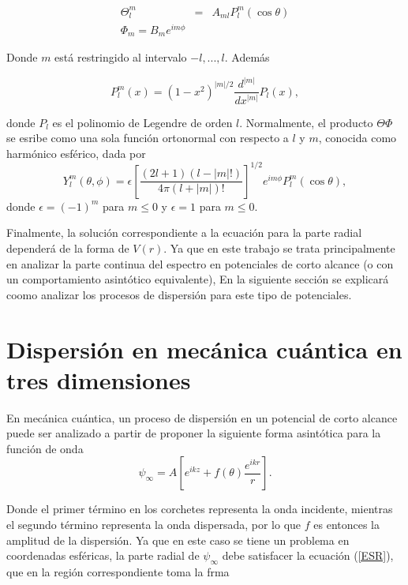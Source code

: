 \begin{eqnarray*}
	\Theta^m_l & = & A_{ml} P^m_l(\cos{\theta})
	\\
	\Phi_m =B_m  e^{i m \phi}
\end{eqnarray*}

Donde $m$ está restringido al intervalo $-l, ... ,l$. Además

\begin{equation*}
	P^m_l(x) = (1-x^2)^{|m|/2} \frac{d^{|m|}}{dx^{|m|}} P_l(x),
\end{equation*}

donde $P_l$ es el polinomio de Legendre de orden $l$. Normalmente, el producto $\Theta \Phi$ se esribe como una sola función ortonormal con respecto a $l$ y $m$, conocida como harmónico esférico, dada por
\begin{equation*}
Y^m_l(\theta,\phi) = \epsilon \left[ \frac{(2l + 1)(l - |m|!)}{4 \pi (l + |m|)!}\right]^{1/2} e^{i m \phi}P^m_l(\cos{\theta}),
\end{equation*}
donde $\epsilon=(-1)^m$ para $m \le 0$ y $\epsilon=1$ para $m \le 0$.

Finalmente, la solución correspondiente a la ecuación para la parte radial dependerá de la forma de $V(r)$.
Ya que en este trabajo se trata principalmente en analizar la parte continua del espectro en potenciales de corto alcance (o con un comportamiento asintótico equivalente), En la siguiente sección se explicará coomo analizar los procesos de dispersión para este tipo de potenciales.



\section{Dispersión en mecánica cuántica en tres dimensiones}

En mecánica cuántica, un proceso de dispersión en un potencial de corto alcance puede ser analizado a partir de proponer la siguiente forma asintótica para la función de onda
\begin{equation}
	\psi_{\infty} = A \left[e^{i k z} + f(\theta)  \frac{e^{i k r}}{r} \right]. \label{FAD}
\end{equation}

Donde el primer término en los corchetes representa la onda incidente, mientras el segundo término representa la onda dispersada, por lo que $f$ es entonces la amplitud de la dispersión. Ya que en este caso se tiene un problema en coordenadas esféricas, la parte radial de $\psi_\infty$ debe satisfacer la ecuación (\ref{ESR}), que en la región correspondiente toma la frma 

